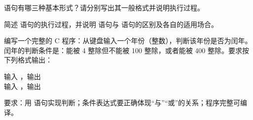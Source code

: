 \documentclass[a4paper,11pt]{article}
\begin{document}
\q {} 语句有哪三种基本形式？请分别写出其一般格式并说明执行过程。\anslines{3.4cm}

\q 简述  语句的执行过程，并说明  语句与  语句的区别及各自的适用场合。\anslines{3.4cm}

\newpage
{}

\q 编写一个完整的 C 程序：从键盘输入一个年份（整数），判断该年份是否为闰年。闰年的判断条件是：能被 4 整除但不能被 100 整除，或者能被 400 整除。要求按下列格式输出：
\par\vspace{0.15em}
\noindent\hspace{2em}输入 ，输出 \\
\noindent\hspace{2em}输入 ，输出 

\noindent 要求：用  语句实现判断；条件表达式要正确体现“与”“或”的关系；程序完整可编译。\anslines{4.0cm}
\end{document}
